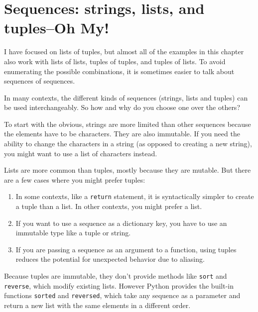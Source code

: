 \section{Sequences: strings, lists, and tuples--Oh My!}

I have focused on lists of tuples, but almost all of the examples in
this chapter also work with lists of lists, tuples of tuples, and
tuples of lists.  To avoid enumerating the possible combinations, it
is sometimes easier to talk about sequences of sequences.

In many contexts, the different kinds of sequences (strings, lists and
tuples) can be used interchangeably.  So how and why do you choose one
over the others?


To start with the obvious, strings are more limited than other
sequences because the elements have to be characters.  They are
also immutable.  If you need the ability to change the characters
in a string (as opposed to creating a new string), you might
want to use a list of characters instead.

Lists are more common than tuples, mostly because they are mutable.
But there are a few cases where you might prefer tuples:

\begin{enumerate}

\item In some contexts, like a {\tt return} statement, it is
syntactically simpler to create a tuple than a list.  In other
contexts, you might prefer a list.

\item If you want to use a sequence as a dictionary key, you
have to use an immutable type like a tuple or string.

\item If you are passing a sequence as an argument to a function,
using tuples reduces the potential for unexpected behavior
due to aliasing.

\end{enumerate}

Because tuples are immutable, they don't provide methods
like {\tt sort} and {\tt reverse}, which modify existing lists.
However Python provides the built-in functions {\tt sorted}
and {\tt reversed}, which take any sequence as a parameter
and return a new list with the same elements in a different
order.

